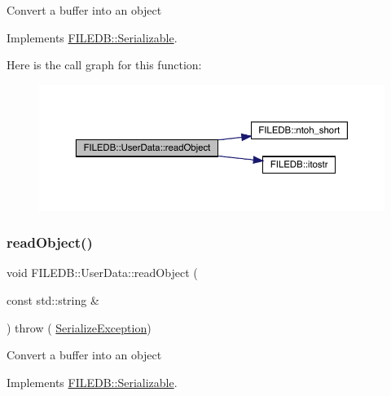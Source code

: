 Convert a buffer into an object 

Implements \mbox{\hyperlink{classFILEDB_1_1Serializable_a21a5831fa4f65790490a8a5eba9fcab2}{F\+I\+L\+E\+D\+B\+::\+Serializable}}.

Here is the call graph for this function\+:\nopagebreak
\begin{figure}[H]
\begin{center}
\leavevmode
\includegraphics[width=350pt]{dc/d12/classFILEDB_1_1UserData_a61ccded861bac4b772af2488a2cc7605_cgraph}
\end{center}
\end{figure}
\mbox{\label{classFILEDB_1_1UserData_a61ccded861bac4b772af2488a2cc7605}} 
\subsubsection{\texorpdfstring{readObject()}{readObject()}\hspace{0.1cm}{\footnotesize\ttfamily [2/2]}}
{\footnotesize\ttfamily void F\+I\+L\+E\+D\+B\+::\+User\+Data\+::read\+Object (\begin{DoxyParamCaption}\item[{const std\+::string \&}]{ }\end{DoxyParamCaption}) throw ( \mbox{\hyperlink{classFILEDB_1_1SerializeException}{Serialize\+Exception}}) \hspace{0.3cm}{\ttfamily [virtual]}}

Convert a buffer into an object 

Implements \mbox{\hyperlink{classFILEDB_1_1Serializable_a21a5831fa4f65790490a8a5eba9fcab2}{F\+I\+L\+E\+D\+B\+::\+Serializable}}.

\mbox{\label{classFILEDB_1_1UserData_a2d1cee48b497ef3f25957ecb1464b7f5}} 
